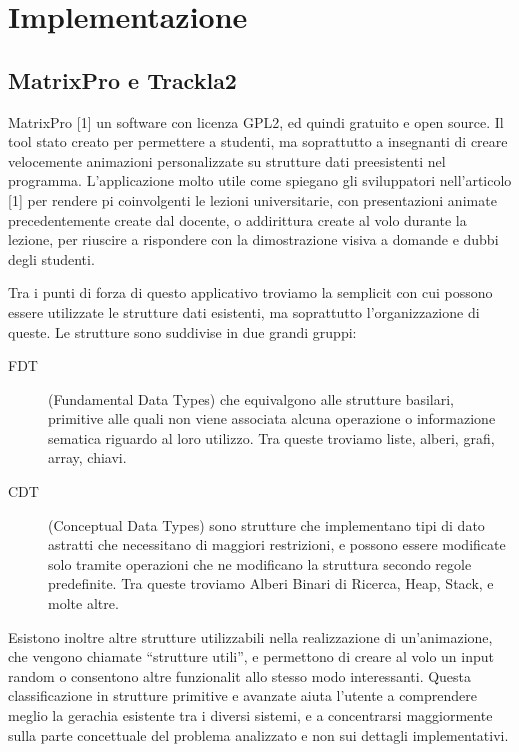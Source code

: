 \chapter{Implementazione}


\section{MatrixPro e Trackla2}

MatrixPro {[}1{]}  un software con licenza GPL2, ed  quindi gratuito
e open source. Il tool  stato creato per permettere a studenti, ma
soprattutto a insegnanti di creare velocemente animazioni personalizzate
su strutture dati preesistenti nel programma. L'applicazione  molto
utile come spiegano gli sviluppatori nell'articolo {[}1{]} per rendere
pi coinvolgenti le lezioni universitarie, con presentazioni animate
precedentemente create dal docente, o addirittura create al volo durante
la lezione, per riuscire a rispondere con la dimostrazione visiva
a domande e dubbi degli studenti.

Tra i punti di forza di questo applicativo troviamo la semplicit
con cui possono essere utilizzate le strutture dati esistenti, ma
soprattutto l'organizzazione di queste. Le strutture sono suddivise
in due grandi gruppi: 
\begin{description}
\item [{FDT}] (Fundamental Data Types) che equivalgono alle strutture basilari,
primitive alle quali non viene associata alcuna operazione o informazione
sematica riguardo al loro utilizzo. Tra queste troviamo liste, alberi,
grafi, array, chiavi.
\item [{CDT}] (Conceptual Data Types) sono strutture che implementano tipi
di dato astratti che necessitano di maggiori restrizioni, e possono
essere modificate solo tramite operazioni che ne modificano la struttura
secondo regole predefinite. Tra queste troviamo Alberi Binari di Ricerca,
Heap, Stack, e molte altre.
\end{description}
Esistono inoltre altre strutture utilizzabili nella realizzazione
di un'animazione, che vengono chiamate {}``strutture utili'', e
permettono di creare al volo un input random o consentono altre funzionalit
allo stesso modo interessanti. Questa classificazione in strutture
primitive e avanzate aiuta l'utente a comprendere meglio la gerachia
esistente tra i diversi sistemi, e a concentrarsi maggiormente sulla
parte concettuale del problema analizzato e non sui dettagli implementativi.


